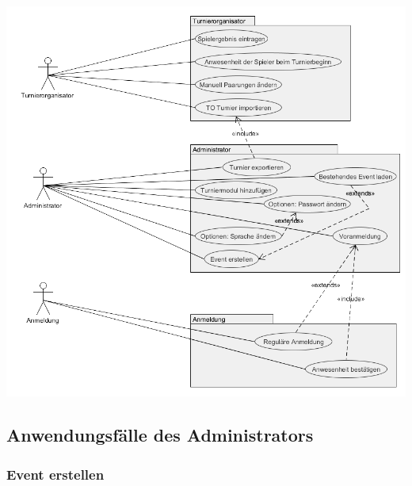 \documentclass[11pt]{article}
\begin{document}
\includegraphics[width=\textwidth]{UseCaseDiagram.png}

\subsection{Anwendungsfälle des Administrators}

\subsubsection{Event erstellen}
\end{document}
